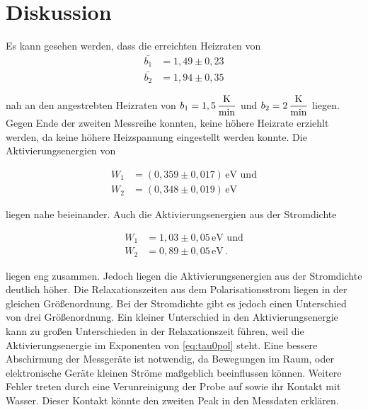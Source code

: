 \section{Diskussion}
\label{sec:Diskussion}

Es kann gesehen werden, dass die erreichten Heizraten von 
\begin{align*}
    \bar{b_1} &=   1,49 \pm  0,23 \\
    \bar{b_2} &=   1,94 \pm  0,35  
\end{align*}

nah an den angestrebten Heizraten von $ b_1 = 1,5 \, \unit{\dfrac{\kelvin}{\minute}}$ 
und $ b_2 = 2 \, \unit{\dfrac{\kelvin}{\minute}}$ liegen.
Gegen Ende der zweiten Messreihe konnten, keine höhere Heizrate erziehlt werden, da keine höhere Heizspannung eingestellt werden konnte.
Die Aktivierungsenergien von 

\begin{align*}
W_1 &=   (0,359 \pm 0,017) \, \unit{\electronvolt} \, \, \text{und}  \\
W_2 &=   (0,348 \pm 0,019) \, \unit{\electronvolt}
\end{align*} 

liegen nahe beieinander. Auch die 
Aktivierungsenergien aus der Stromdichte

\begin{align*}
    W_1 &= 1,03 \pm 0,05 \, \unit{\electronvolt}  \, \,  \text{und} \\
    W_2 &= 0,89 \pm 0,05 \, \unit{\electronvolt}    \,.
\end{align*}

liegen eng zusammen. Jedoch liegen die Aktivierungsenergien aus der Stromdichte deutlich höher.
Die Relaxationszeiten aus dem Polarisationsstrom liegen in der gleichen Größenordnung.
Bei der Stromdichte gibt es jedoch einen Unterschied von drei Größenordnung.
Ein kleiner Unterschied in den Aktivierungsenergie kann zu großen Unterschieden in der Relaxationszeit führen, weil 
die Aktivierungsenergie im Exponenten von \autoref{eq:tau0pol} steht.
Eine bessere Abschirmung der Messgeräte ist notwendig, da Bewegungen im Raum, 
oder elektronische Geräte kleinen Ströme maßgeblich beeinflussen können.
Weitere Fehler treten durch eine Verunreinigung der Probe auf sowie ihr Kontakt mit Wasser.
Dieser Kontakt könnte den zweiten Peak in den Messdaten erklären.
